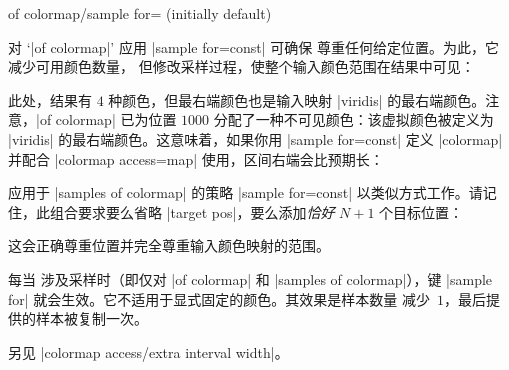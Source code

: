 {\begin{enumerate}
\begin{pgfplotskey}{of colormap/sample for= (initially default)}
\begin{itemize}
                    对 `|of colormap|' 应用 |sample for=const| 可确保
                    尊重任何给定位置。为此，它减少可用颜色数量，
                    但修改采样过程，使整个输入颜色范围在结果中可见：
\begin{codeexample}[]
\pgfplotscolorbardrawstandalone[
    colormap={example}{
        of colormap={
            viridis,
            target pos={0,500,850,950,1000},
            sample for=const,
        },
    },
    colorbar horizontal,
    colormap access=const]
\end{codeexample}
                    此处，结果有 $4$ 种颜色，但最右端颜色也是输入映射
                    |viridis| 的最右端颜色。注意，|of colormap| 已为位置
                    $1000$ 分配了一种不可见颜色：该虚拟颜色被定义为
                    |viridis| 的最右端颜色。这意味着，如果你用
                    |sample for=const| 定义 |colormap| 并配合
                    |colormap access=map| 使用，区间右端会比预期长：
\begin{codeexample}[]
\pgfplotscolorbardrawstandalone[
    colormap={example}{
        of colormap={
            viridis,
            target pos={0,500,850,950,1000},
            sample for=const,
        },
    },
    colorbar horizontal,
    colormap access=map]
\end{codeexample}

                    应用于 |samples of colormap| 的策略 |sample for=const|
                    以类似方式工作。请记住，此组合要求要么省略
                    |target pos|，要么添加\emph{恰好} $N+1$ 个目标位置：
\begin{codeexample}[]
\pgfplotscolorbardrawstandalone[
    colormap={example}{
        samples of colormap={
            5 of viridis,
            target pos={0,100,500,850,950,1000},
            sample for=const,
        },
    },
    colorbar horizontal,
    colormap access=const]
\end{codeexample}

                    这会正确尊重位置并完全尊重输入颜色映射的范围。
            \end{itemize}

            每当  涉及采样时（即仅对
            |of colormap| 和 |samples of colormap|），键 |sample for|
            就会生效。它不适用于显式固定的颜色。其效果是样本数量
            减少~$1$，最后提供的样本被复制一次。

            另见 |colormap access/extra interval width|。
        \end{pgfplotskey}


\end{enumerate}}
